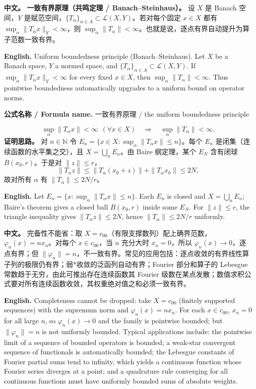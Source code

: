 \documentclass[UTF8,11pt,a4paper]{ctexart}
\newcommand{\EN}[1]{\par\noindent \textbf{English.} #1\par}
\newcommand{\FORMULA}[2]{\par\noindent\textbf{公式名称 / Formula name.} #1 / #2\par}
\newcommand{\APS}[2]{\par\noindent\textbf{中文。} #1\par\noindent\textbf{English.} #2\par\smallskip}
\begin{document}
\APS{\textbf{一致有界原理（共鸣定理 / Banach--Steinhaus）。} 设 $X$ 是 Banach 空间，$Y$ 是赋范空间，$\{T_\alpha\}_{\alpha\in A}\subset\mathcal L(X,Y)$。若对每个固定 $x\in X$ 都有 $\sup_\alpha\|T_\alpha x\|_Y<\infty$，则 $\sup_\alpha\|T_\alpha\|<\infty$。也就是说，逐点有界自动提升为算子范数一致有界。}{Uniform boundedness principle (Banach--Steinhaus). Let $X$ be a Banach space, $Y$ a normed space, and $\{T_\alpha\}_{\alpha\in A}\subset\mathcal L(X,Y)$. If $\sup_\alpha\|T_\alpha x\|_Y<\infty$ for every fixed $x\in X$, then $\sup_\alpha\|T_\alpha\|<\infty$. Thus pointwise boundedness automatically upgrades to a uniform bound on operator norms.}
\FORMULA{一致有界原理}{the uniform boundedness principle}
\[
\sup_{\alpha}\|T_\alpha x\|<\infty\ \ (\forall x\in X)
\quad\Longrightarrow\quad
\sup_{\alpha}\|T_\alpha\|<\infty.
\]
\noindent\textbf{证明思路。} 对 $n\in\mathbb N$ 令 $E_n=\{x\in X:\sup_\alpha\|T_\alpha x\|\le n\}$。每个 $E_n$ 是闭集（连续函数的水平集之交），且 $X=\bigcup_nE_n$。由 Baire 纲定理，某个 $E_N$ 含有闭球 $\overline B(x_0,r)$。于是对 $\|z\|\le r$，
\[
\|T_\alpha z\|\le\|T_\alpha(x_0+z)\|+\|T_\alpha x_0\|\le 2N,
\]
故对所有 $\alpha$ 有 $\|T_\alpha\|\le2N/r$。\EN{Let $E_n=\{x:\sup_\alpha\|T_\alpha x\|\le n\}$. Each $E_n$ is closed and $X=\bigcup_nE_n$; Baire's theorem gives a closed ball $\overline B(x_0,r)$ inside some $E_N$. For $\|z\|\le r$, the triangle inequality gives $\|T_\alpha z\|\le2N$, hence $\|T_\alpha\|\le2N/r$ uniformly.}

\APS{完备性不能省：取 $X=c_{00}$（有限支撑数列）配上确界范数，$\varphi_n(x)=nx_n$。对每个 $x\in c_{00}$，当 $n$ 充分大时 $x_n=0$，所以 $\varphi_n(x)\to0$，逐点有界；但 $\|\varphi_n\|=n$，不一致有界。常见的应用包括：逐点收敛的有界线性算子列的极限仍有界；弱*收敛的泛函列自动有界；Fourier 部分和算子的 Lebesgue 常数趋于无穷，由此可推出存在连续函数其 Fourier 级数在某点发散；数值求积公式要对所有连续函数收敛，其权重绝对值之和必须一致有界。}{Completeness cannot be dropped: take $X=c_{00}$ (finitely supported sequences) with the supremum norm and $\varphi_n(x)=nx_n$. For each $x\in c_{00}$, $x_n=0$ for all large $n$, so $\varphi_n(x)\to0$ and the family is pointwise bounded; but $\|\varphi_n\|=n$ is not uniformly bounded. Typical applications include: the pointwise limit of a sequence of bounded operators is bounded; a weak-star convergent sequence of functionals is automatically bounded; the Lebesgue constants of Fourier partial sums tend to infinity, which yields a continuous function whose Fourier series diverges at a point; and a quadrature rule converging for all continuous functions must have uniformly bounded sums of absolute weights.}
\end{document}
